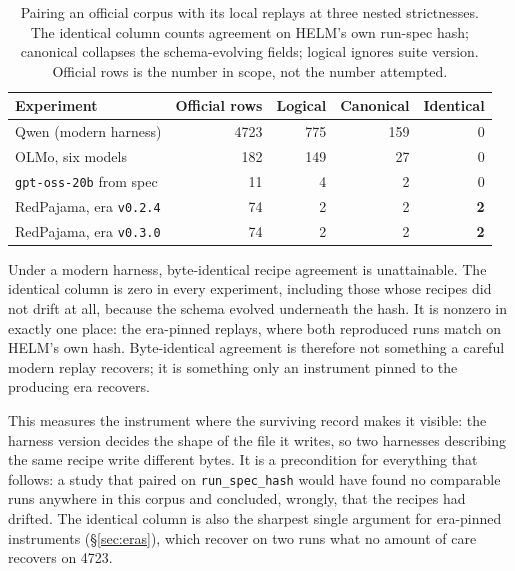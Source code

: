 \begin{table}[t]
\caption{Pairing an official corpus with its local replays at three nested
strictnesses. The identical column counts agreement on HELM's own run-spec hash;
canonical collapses the schema-evolving fields; logical ignores suite version.
Official rows is the number in scope, not the number attempted.}
\label{tab:coverage}
\begin{center}
\small
\begin{tabular}{lrrrr}
\toprule
\textbf{Experiment} & \textbf{Official rows} & \textbf{Logical} & \textbf{Canonical} & \textbf{Identical} \\
\midrule
Qwen (modern harness)          & 4723 & 775 & 159 & 0 \\
OLMo, six models               &  182 & 149 &  27 & 0 \\
\texttt{gpt-oss-20b} from spec &   11 &   4 &   2 & 0 \\
RedPajama, era \texttt{v0.2.4} &   74 &   2 &   2 & \textbf{2} \\
RedPajama, era \texttt{v0.3.0} &   74 &   2 &   2 & \textbf{2} \\
\bottomrule
\end{tabular}
\end{center}
\end{table}

Under a modern harness, byte-identical recipe agreement is unattainable. The
identical column is zero in every experiment, including those whose recipes did
not drift at all, because the schema evolved underneath the hash. It is nonzero
in exactly one place: the era-pinned replays, where both reproduced runs match on
HELM's own hash. Byte-identical agreement is therefore not something a careful
modern replay recovers; it is something only an instrument pinned to the
producing era recovers.

This measures the instrument where the surviving record makes it visible: the
harness version decides the shape of the file it writes, so two harnesses
describing the same recipe write different bytes. It is a precondition for
everything that follows: a study that paired on
\texttt{run\_spec\_hash} would have found no comparable runs anywhere in this
corpus and concluded, wrongly, that the recipes had drifted. The identical column
is also the sharpest single argument for era-pinned instruments (\S\ref{sec:eras}),
which recover on two runs what no amount of care recovers on 4723.

